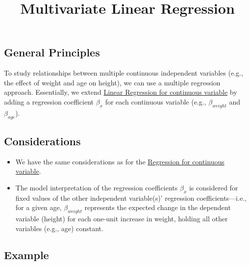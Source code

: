 \documentclass[
  letterpaper,
  DIV=11,
  numbers=noendperiod]{scrartcl}
\title{Multivariate Linear Regression}
\author{}
\date{}
\begin{document}
\maketitle


\subsection{General Principles}\label{general-principles}

To study relationships between multiple continuous independent variables
(e.g., the effect of weight and age on height), we can use a multiple
regression approach. Essentially, we extend
\href{1.\%20Linear\%20Regression\%20for\%20continuous\%20variable.qmd}{Linear
Regression for continuous variable} by adding a regression coefficient
\(\beta_x\) for each continuous variable (e.g., \(\beta_{weight}\) and
\(\beta_{age}\)).

\subsection{Considerations}\label{considerations}

\begin{tcolorbox}[enhanced jigsaw, coltitle=black, colbacktitle=quarto-callout-note-color!10!white, colframe=quarto-callout-note-color-frame, toprule=.15mm, bottomtitle=1mm, left=2mm, opacityback=0, colback=white, title=\textcolor{quarto-callout-note-color}{\faInfo}\hspace{0.5em}{Note}, leftrule=.75mm, toptitle=1mm, titlerule=0mm, arc=.35mm, breakable, opacitybacktitle=0.6, rightrule=.15mm, bottomrule=.15mm]

\begin{itemize}
\item
  We have the same considerations as for the
  \href{1.\%20Linear\%20Regression\%20for\%20continuous\%20variable.qmd}{Regression
  for continuous variable}.
\item
  The model interpretation of the regression coefficients \(\beta_x\) is
  considered for fixed values of the other independent variable(s)'
  regression coefficients---i.e., for a given age, \(\beta_{weight}\)
  represents the expected change in the dependent variable (height) for
  each one-unit increase in weight, holding all other variables (e.g.,
  age) constant.
\end{itemize}

\end{tcolorbox}

\subsection{Example}\label{example}
\end{document}
